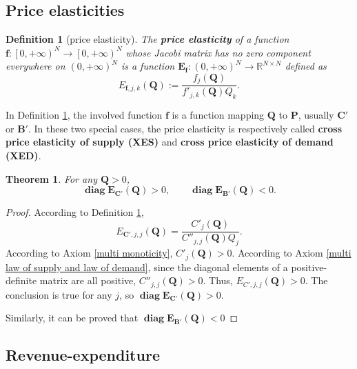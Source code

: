 \documentclass{article}
\newtheorem{theorem}{Theorem}[subsection]
\newtheorem{definition}{Definition}[subsection]
\begin{document}
\subsection{Price elasticities}

\begin{definition}[price elasticity]
\label{multi price elasticity}
The \textbf{price elasticity} of a function $\mathbf f:\left[0,+\infty\right)^N\to\left[0,+\infty\right)^N$ whose Jacobi matrix has no zero component everywhere on $\left(0,+\infty\right)^N$ is a function $\mathbf E_\mathbf f:\left(0,+\infty\right)^N\to\mathbb R^{N\times N}$ defined as
$$E_{\mathbf f,j,k}\left(\mathbf Q\right):=\frac{f_j\left(\mathbf Q\right)}{f'_{j,k}\left(\mathbf Q\right)Q_k}.$$
\end{definition}

In Definition \ref{multi price elasticity}, the involved function $\mathbf f$ is a function mapping $\mathbf Q$ to $\mathbf P$,
usually $\mathbf C'$ or $\mathbf B'$.
In these two special cases, the price elasticity is respectively called \textbf{cross price elasticity of supply (XES)} and \textbf{cross price elasticity of demand (XED)}.

\begin{theorem}
For any $\mathbf Q>0$,
$$\operatorname{\mathbf{diag}}\mathbf E_{\mathbf C'}\left(\mathbf Q\right)>0,\qquad\operatorname{\mathbf{diag}}\mathbf E_{\mathbf B'}\left(\mathbf Q\right)<0.$$
\end{theorem}
\begin{proof}
According to Definition \ref{multi price elasticity},
\begin{equation}
E_{\mathbf C',j,j}\left(\mathbf Q\right)=\frac{C'_j\left(\mathbf Q\right)}{C''_{j,j}\left(\mathbf Q\right)Q_j}.
\end{equation}
According to Axiom \ref{multi monoticity}, $C'_j\left(\mathbf Q\right)>0$.
According to Axiom \ref{multi law of supply and law of demand},
since the diagonal elements of a positive-definite matrix are all positive,
$C''_{j,j}\left(\mathbf Q\right)>0$.
Thus, $E_{C',j,j}\left(\mathbf Q\right)>0$.
The conclusion is true for any $j$, so $\operatorname{\mathbf{diag}}\mathbf E_{\mathbf C'}\left(\mathbf Q\right)>0$.

Similarly, it can be proved that $\operatorname{\mathbf{diag}}\mathbf E_{\mathbf B'}\left(\mathbf Q\right)<0$
\end{proof}

\subsection{Revenue-expenditure}
\end{document}
